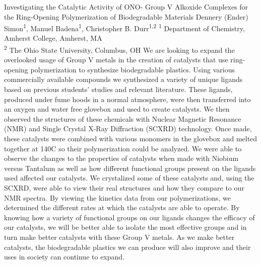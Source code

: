 \makeabstract
    {
    Investigating the Catalytic Activity of ONO- Group V Alkoxide Complexes for the Ring-Opening Polymerization of Biodegradable Materials
    }
    {
    Dennery (Ender) Simon\textsuperscript{1}, Manuel Badena\textsuperscript{1}, Christopher B. Durr\textsuperscript{1,2}
    }
    {
    \textsuperscript{1} Department of Chemistry, Amherst College, Amherst, MA\\
\textsuperscript{2} The Ohio State University, Columbus, OH
    }
    {
    We are looking to expand the overlooked usage of Group V metals in the creation of catalysts that use ring-opening polymerization to synthesize biodegradable plastics.
    }
    {
    Using various commercially available compounds we synthesized a variety of unique ligands based on previous students' studies and relevant literature.  These ligands, produced under fume hoods in a normal atmosphere, were then transferred into an oxygen and water free glovebox and used to create catalysts.  We then observed the structures of these chemicals with Nuclear Magnetic Resonance (NMR) and Single Crystal X-Ray Diffraction (SCXRD) technology.  Once made, these catalysts were combined with various monomers in the glovebox and melted together at 140{\textdegree}C so their polymerization could be analyzed.
    }
    {
    We were able to observe the changes to the properties of catalysts when made with Niobium versus Tantalum as well as how different functional groups present on the ligands used affected our catalysts.  We crystalized some of these catalysts and, using the SCXRD, were able to view their real structures and how they compare to our NMR spectra.  By viewing the kinetics data from our polymerizations, we determined the different rates at which the catalysts are able to operate.
    }
    {
    By knowing how a variety of functional groups on our ligands changes the efficacy of our catalysts, we will be better able to isolate the most effective groups and in turn make better catalysts with these Group V metals.  As we make better catalysts, the biodegradable plastics we can produce will also improve and their uses in society can continue to expand.
    }

    \newpage
    